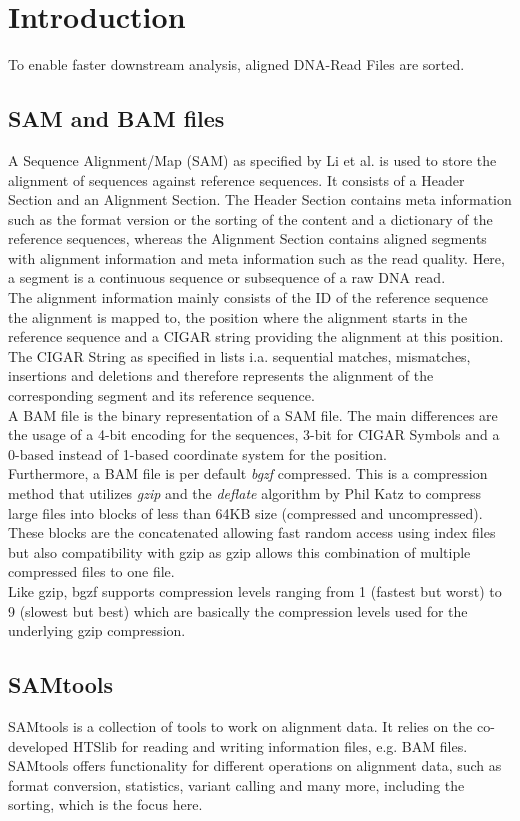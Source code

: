\section{Introduction}
To enable faster downstream analysis, aligned DNA-Read Files are sorted.

\subsection{SAM and BAM files}
A Sequence Alignment/Map (SAM) as specified by Li et al. \cite{samformat} is used to store the alignment of sequences against reference sequences. It consists of a Header Section and an Alignment Section. The Header Section contains meta information such as the format version or the sorting of the content and a dictionary of the reference sequences, whereas the Alignment Section contains aligned segments with alignment information and meta information such as the read quality. Here, a segment is a continuous sequence or subsequence of a raw DNA read. \\
The alignment information mainly consists of the ID of the reference sequence the alignment is mapped to, the position where the alignment starts in the reference sequence and a CIGAR string providing the alignment at this position. The CIGAR String as specified in \cite{samformat} lists i.a. sequential matches, mismatches, insertions and deletions and therefore represents the alignment of the corresponding segment and its reference sequence. \\
A BAM file is the binary representation of a SAM file. The main differences are the usage of a 4-bit encoding for the sequences, 3-bit for CIGAR Symbols and a 0-based instead of 1-based coordinate system for the position. \\
Furthermore, a BAM file is per default \textit{bgzf} compressed. This is a compression method that utilizes \textit{gzip} \cite{gzip} and the \textit{deflate} algorithm \cite{deflate} by Phil Katz to compress large files into blocks of less than 64KB size (compressed and uncompressed). These blocks are the concatenated allowing fast random access using index files but also compatibility with gzip as gzip allows this combination of multiple compressed files to one file. \\
Like gzip, bgzf supports compression levels ranging from 1 (fastest but worst) to 9 (slowest but best) which are basically the compression levels used for the underlying gzip compression.

\subsection{SAMtools}
SAMtools \cite{12ySamtools} is a collection of tools to work on alignment data. It relies on the co-developed HTSlib \cite{bonfield_htslib_2021} for reading and writing information files, e.g. BAM files. SAMtools offers functionality for different operations on alignment data, such as format conversion, statistics, variant calling and many more, including the sorting, which is the focus here.
